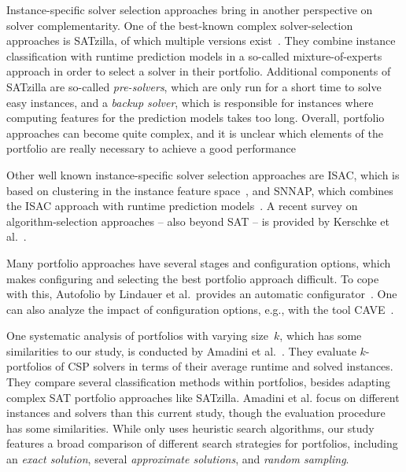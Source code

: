 \documentclass[conference]{IEEEtran}
\begin{document}
Instance-specific solver selection approaches bring in another perspective on solver complementarity.
One of the best-known complex solver-selection approaches is SATzilla, of which multiple versions exist~\cite{xu2008satzilla, xu2012satzilla2012}. 
They combine instance classification with runtime prediction models in a so-called mixture-of-experts approach in order to select a solver in their portfolio. 
Additional components of SATzilla are so-called \emph{pre-solvers}, which are only run for a short time to solve easy instances, and a \emph{backup solver}, which is responsible for instances where computing features for the prediction models takes too long.
Overall, portfolio approaches can become quite complex, and it is unclear which elements of the portfolio are really necessary to achieve a good performance 

Other well known instance-specific solver selection approaches are ISAC, which is based on clustering in the instance feature space~\cite{Kadioglu:2010:ISAC}, and SNNAP, which combines the ISAC approach with runtime prediction models~\cite{Collautti:2013:SNNAP}.
A recent survey on algorithm-selection approaches -- also beyond SAT -- is provided by Kerschke et al.~\cite{kerschke2019automated}.

Many portfolio approaches have several stages and configuration options, which makes configuring and selecting the best portfolio approach difficult.
To cope with this, Autofolio by Lindauer et al.\ provides an automatic configurator~\cite{lindauer2015autofolio}.
One can also analyze the impact of configuration options, e.g., with the tool CAVE~\cite{biedenkapp2018cave}.

One systematic analysis of portfolios with varying size~$k$, which has some similarities to our study, is conducted by Amadini et al.~\cite{amadini2014empirical, amadini2016extensive}.
They evaluate $k$-portfolios of CSP solvers in terms of their average runtime and solved instances. 
They compare several classification methods within portfolios, besides adapting complex SAT portfolio approaches like SATzilla. 
Amadini et al. focus on different instances and solvers than this current study, though the evaluation procedure has some similarities.
While \cite{amadini2014empirical} only uses heuristic search algorithms, 
our study features a broad comparison of different search strategies for portfolios, including an \emph{exact solution}, several \emph{approximate solutions}, and \emph{random sampling}. 
\end{document}
